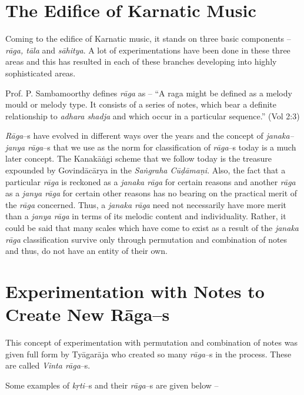 \section*{The Edifice of Karnatic Music}

Coming to the edifice of Karnatic music, it stands on three basic components – \textit{rāga, tāla} and \textit{sāhitya}. A lot of experimentations have been done in these three areas and this has resulted in each of these branches developing into highly sophisticated areas.

Prof. P. Sambamoorthy defines \textit{rāga} as – “A raga might be defined as a melody mould or melody type. It consists of a series of notes, which bear a definite relationship to \textit{adhara shadja} and which occur in a particular sequence.” (Vol 2:3)

\textit{Rāga}–s have evolved in different ways over the years and the concept of \textit{janaka–janya rāga}–s that we use as the norm for classification of \textit{rāga}–s today is a much later concept. The Kanakāṅgi scheme that we follow today is the treasure expounded by Govindācārya in the \textit{Saṅgraha Cūḍāmaṇi}. Also, the fact that a particular \textit{rāga} is reckoned as a \textit{janaka rāga} for certain reasons and another \textit{rāga} as a \textit{janya rāga} for certain other reasons has no bearing on the practical merit of the \textit{rāga} concerned. Thus, a \textit{janaka rāga} need not necessarily have more merit than a \textit{janya rāga} in terms of its melodic content and individuality. Rather, it could be said that many scales which have come to exist as a result of the \textit{janaka rāga} classification survive only through permutation and combination of notes and thus, do not have an entity of their own.


\section*{Experimentation with Notes to Create New Rāga–s}

This concept of experimentation with permutation and combination of notes was given full form by Tyāgarāja who created so many \textit{rāga}–s in the process. These are called \textit{Vinta rāga}–s.

Some examples of \textit{kṛti}–s and their \textit{rāga}–s are given below –

